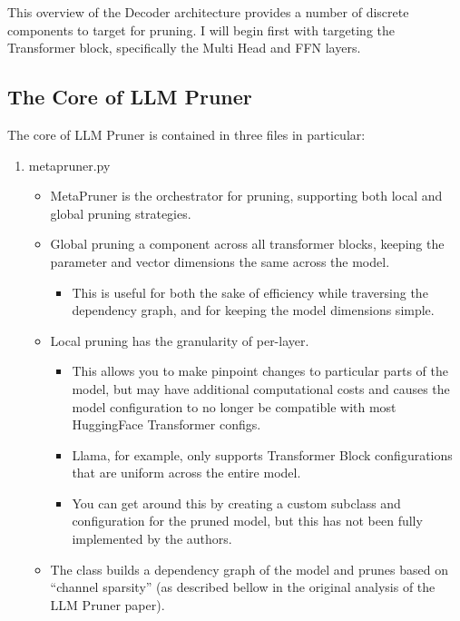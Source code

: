 \documentclass{article}
\begin{document}
    This overview of the Decoder architecture provides a number of discrete components to target for pruning.
    I will begin first with targeting the Transformer block, specifically the Multi Head and FFN layers.

    \subsection{The Core of LLM Pruner}\label{subsec:core-of-llm-pruner}

    The core of LLM Pruner is contained in three files in particular:

    \begin{enumerate}
        \item metapruner.py
        \begin{itemize}
            \item MetaPruner is the orchestrator for pruning, supporting both local and global pruning strategies.
            \item Global pruning a component across all transformer blocks, keeping the parameter and vector dimensions the same across the model.
            \begin{itemize}
                \item This is useful for both the sake of efficiency while traversing the dependency graph, and for keeping the model dimensions simple.
            \end{itemize}
            \item Local pruning has the granularity of per-layer.
            \begin{itemize}
                \item This allows you to make pinpoint changes to particular parts of the model, but may have additional computational costs and causes the model configuration to no longer be compatible with most HuggingFace Transformer configs.
                \item Llama, for example, only supports Transformer Block configurations that are uniform across the entire model.
                \item You can get around this by creating a custom subclass and configuration for the pruned model, but this has not been fully implemented by the authors.
            \end{itemize}
            \item The class builds a dependency graph of the model and prunes based on ``channel sparsity'' (as described bellow in the original analysis of the LLM Pruner paper).

\end{itemize}
\end{enumerate}
\end{document}
